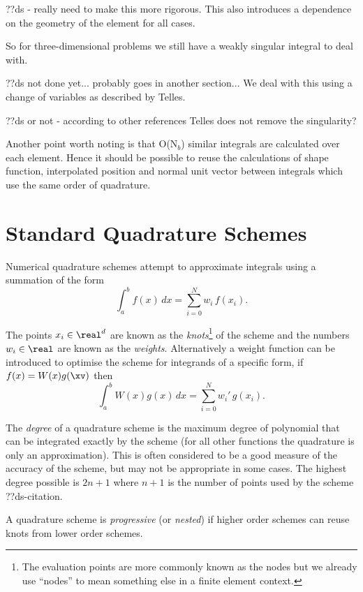 ??ds - really need to make this more rigorous. This also introduces a dependence on the geometry of the element for all cases.

So for three-dimensional problems we still have a weakly singular integral to deal with.

??ds not done yet... probably goes in another section... We deal with this using a change of variables as described by Telles\cite{Telles1987}.

??ds or not - according to other references Telles does not remove the singularity?

Another point worth noting is that O(N$_b$) similar integrals are calculated over each element.
Hence it should be possible to reuse the calculations of shape function, interpolated position and normal unit vector between integrals which use the same order of quadrature.

\section{Standard Quadrature Schemes}

Numerical quadrature schemes attempt to approximate integrals using a summation of the form
\[ \int_a^b f(x) \, dx = \sum_{i=0}^N w_i \, f(x_i). \]

The points $x_i \in \real^d$ are known as the \emph{knots}\footnote{The evaluation points are more commonly known as the nodes but we already use ``nodes'' to mean something else in a finite element context.} of the scheme and the numbers $w_i \in \real$ are known as the \emph{weights}.
Alternatively a weight function can be introduced to optimise the scheme for integrands of a specific form, if $f(x) = W(x) g(\xv)$ then
\begin{equation}
  \label{eq:9}
  \int_a^b W(x) g(x) \, dx = \sum_{i=0}^N w_i' \, g(x_i).
\end{equation}

The \emph{degree} of a quadrature scheme is the maximum degree of polynomial that can be integrated exactly by the scheme (for all other functions the quadrature is only an approximation).
This is often considered to be a good measure of the accuracy of the scheme, but may not be appropriate in some cases.\cite{Trefethen2008}
The highest degree possible is $2n + 1$ where $n + 1$ is the number of points used by the scheme ??ds-citation.

A quadrature scheme is \emph{progressive} (or \emph{nested}) if higher order schemes can reuse knots from lower order schemes.

